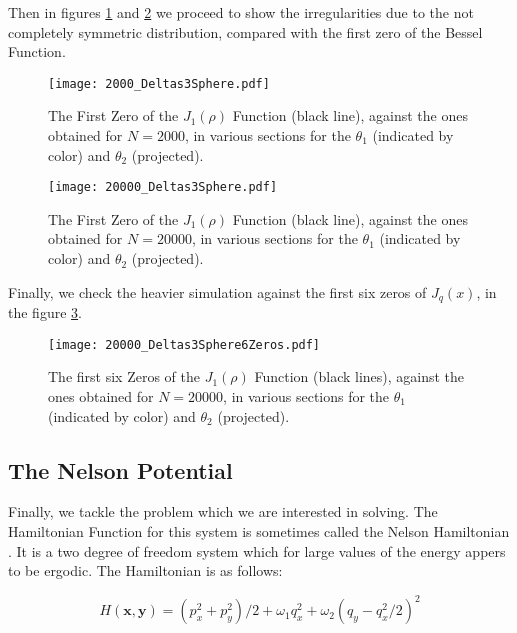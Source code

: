 \documentclass[a4paper,12pt]{article}
\newcommand{\xfase}{\mathbf{x}}
\newcommand{\yfase}{\mathbf{y}}
\begin{document}
Then in figures \ref{Zeros2000} and \ref{Zeros20000} 
we proceed to show the irregularities due to the
not completely symmetric distribution, compared with 
the first zero of the Bessel Function.

\begin{figure}
\begin{center}
  \texttt{[image: 2000\_Deltas3Sphere.pdf]}
\caption{The First Zero of the $J_1(\rho)$ Function (black line),
  against the ones obtained for $N=2000$, in various 
sections for the $\theta_1$ (indicated by color) and $\theta_2$ 
(projected).}
\label{Zeros2000}
\end{center}
\end{figure}
 

\begin{figure}
\begin{center}
  \texttt{[image: 20000\_Deltas3Sphere.pdf]}
\caption{The First Zero of the $J_1(\rho)$ Function (black line),
  against the ones obtained for $N=20000$, in various 
sections for the $\theta_1$ (indicated by color) and $\theta_2$ 
(projected).}
\label{Zeros20000}
\end{center}
\end{figure}
 
Finally, we check the heavier simulation against the first six
zeros of $J_q(x)$, in the figure \ref{SeisZeros}.


\begin{figure}
\begin{center}
  \texttt{[image: 20000\_Deltas3Sphere6Zeros.pdf]}
\caption{The first six Zeros of the $J_1(\rho)$ Function (black lines),
  against the ones obtained for $N=20000$, in various 
sections for the $\theta_1$ (indicated by color) and $\theta_2$ 
(projected).}
\label{SeisZeros}
\end{center}
\end{figure}


\subsection{The Nelson Potential}

Finally, we tackle the problem which we are interested in solving.
The Hamiltonian Function for this system is sometimes called the Nelson
Hamiltonian \cite{Toscano01}.
It is a two degree of freedom system which for large
values of the energy appers to be ergodic. The Hamiltonian is
as follows:

\begin{equation}
H(\xfase,\yfase)=(p_x^2+p_y^2)/2+\omega_1 q_x^2+
\omega_2(q_y-q_x^2/2)^2
\end{equation}
\end{document}
